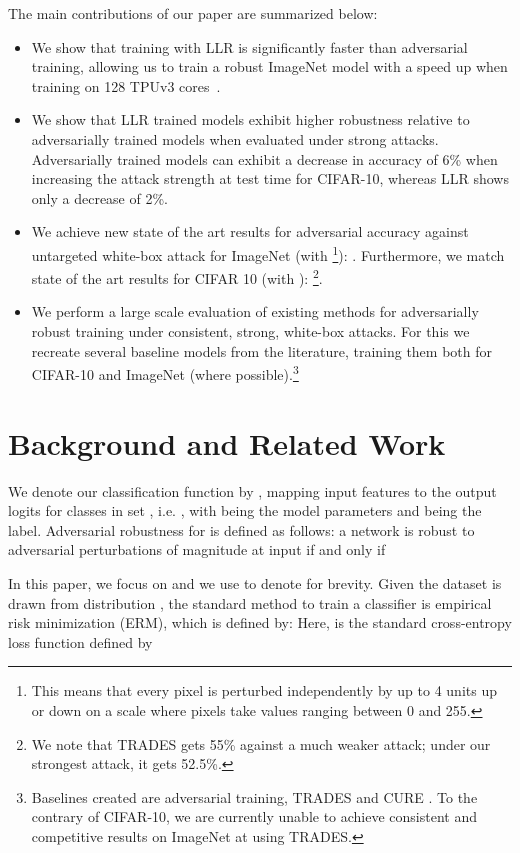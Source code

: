 \documentclass{article}
\theoremstyle{plain}
\theoremstyle{definition}
\theoremstyle{remark}
\begin{document}
The main contributions of our paper are summarized below:
\begin{itemize}
\item We show that training with LLR is significantly faster than adversarial training, allowing us to train a robust ImageNet model with a  speed up when training on 128 TPUv3 cores~\citep{tpu}.
\item We show that LLR trained models exhibit higher robustness relative to adversarially trained models when  evaluated under strong attacks. Adversarially trained models can exhibit a decrease in accuracy of 6\% when increasing the attack strength at test time for CIFAR-10, whereas LLR shows only a decrease of 2\%.
\item We achieve new state of the art results for adversarial accuracy against untargeted white-box attack for ImageNet (with \footnote{This means that every pixel is perturbed independently by up to 4 units up or down on a scale where pixels take values ranging between 0 and 255.}): . Furthermore, we match state of the art results for CIFAR 10 (with ): \footnote{We note that TRADES \cite{zhang2019theoretically} gets 55\% against a much weaker attack; under our strongest attack, it gets 52.5\%.}. 
\item We perform a  large scale evaluation of existing methods for adversarially robust training under consistent, strong, white-box attacks. For this we recreate several baseline models from the literature, training them both for CIFAR-10 and ImageNet (where possible).\footnote{Baselines created are adversarial training, TRADES and CURE \cite{moosavi2018robustness}. To the contrary of CIFAR-10, we are currently unable to achieve consistent and competitive results on ImageNet at  using TRADES.}
\end{itemize}

 \section{Background and Related Work}
We denote our classification function by , mapping input features  to the output logits for classes in set , i.e. , with  being the model parameters and  being the label. Adversarial robustness for  is defined as follows: a network is robust to adversarial perturbations of magnitude  at input  if and only if

In this paper, we focus on  and we use  to denote  for brevity. Given the dataset is drawn from distribution , the standard method to train a classifier  is empirical risk minimization (ERM), which is defined by:
 Here,  is the standard cross-entropy loss function defined by
\end{document}
